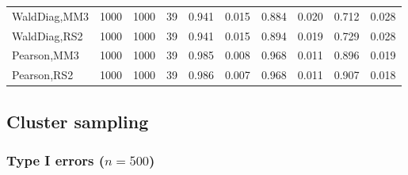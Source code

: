 \documentclass[
]{article}
\begin{document}
\begin{table}[H]
{\begin{tabular}[t]{lrrrrrrlrr}
\hspace{1em}WaldDiag,MM3 & 1000 & 1000 & 39 & 0.941 & 0.015 & 0.884 & 0.020 & 0.712 & 0.028\\
\hspace{1em}WaldDiag,RS2 & 1000 & 1000 & 39 & 0.941 & 0.015 & 0.894 & 0.019 & 0.729 & 0.028\\
\hspace{1em}Pearson,MM3 & 1000 & 1000 & 39 & 0.985 & 0.008 & 0.968 & 0.011 & 0.896 & 0.019\\
\hspace{1em}Pearson,RS2 & 1000 & 1000 & 39 & 0.986 & 0.007 & 0.968 & 0.011 & 0.907 & 0.018\\
\bottomrule
\end{tabular}}
\endgroup{}
\end{table}

\hypertarget{cluster-sampling}{%
\subsection{Cluster sampling}\label{cluster-sampling}}

\hypertarget{type-i-errors-n500-2}{%
\subsubsection{\texorpdfstring{Type I errors
(\(n=500\))}{Type I errors (n=500)}}\label{type-i-errors-n500-2}}
\end{document}
